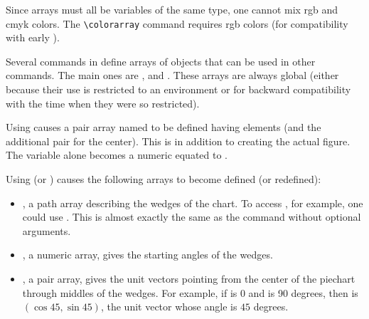 \documentclass[letterpaper]{article}
\begin{document}
Since arrays must all be variables of the same type, one cannot mix rgb
and cmyk colors. The \verb$\colorarray$ command requires rgb colors (for
compatibility with early \MP{}).

Several commands in \mfp{} define arrays of objects that can be used in
other commands. The main ones are ,  and
. These arrays are always global (either because their
use is restricted to an  environment or for backward
compatibility with the time when they were so restricted).

Using  causes a
pair array named  to be defined having  elements (and
the additional pair  for the center). This is in addition to
creating the actual figure. The variable  alone becomes a numeric
equated to .

Using  (or ) causes the following arrays to
become defined (or redefined):
\begin{itemize}
  \item {}, a path array describing the wedges of the chart.
        To access , for example, one could use
        . This is almost exactly the
        same as the \mfp{} command  without
        optional arguments.
  \item {}, a numeric array, gives the starting angles of
        the wedges.
  \item {}, a pair array, gives the unit vectors
        pointing from the center of the piechart through middles of the
        wedges. For example, if  is 0 and 
        is 90 degrees, then  is $(\cos 45,\sin 45)$,
        the unit vector whose angle is $45$ degrees.
\end{itemize}
\end{document}
